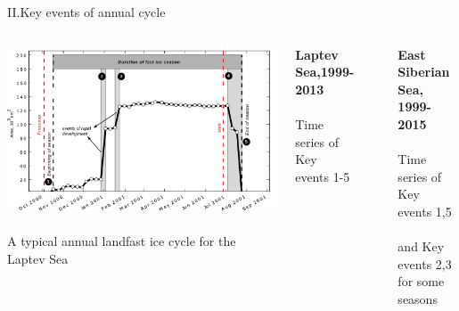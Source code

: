\documentclass[8pt]{beamer}
\newcommand\Fontvi{\fontsize{6}{7.2}\selectfont}
\begin{document}
\setwatermark{\fontsize{125pt}{125pt}\selectfont{}}
\begin{frame}[fragile]{II.Key events of annual cycle}
	\begin{columns}
		\includegraphics[width=1.0\textwidth]{./img/Key_events_LS0.pdf}\\~\\
	A typical annual landfast ice cycle for the Laptev Sea
		\Fontvi
		[Selyuzhenok et al. 2015]
			\begin{center}
				\textbf{Laptev Sea,1999-2013 }\\~\\
				Time series of Key events  1-5
			\end{center}
			~\\
			\begin{center}
				\textbf{East Siberian Sea, 1999-2015}\\~\\
				Time series of Key events  1,5\\~\\ and Key events 2,3 for some seasons
			\end{center}
		\end{columns}
\end{frame}
\end{document}
